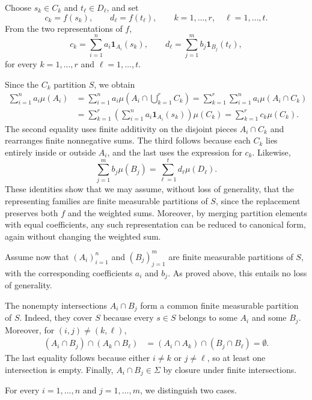 Choose $s_k\in C_k$ and $t_\ell\in D_\ell$, and set
\[
c_k=f(s_k),\qquad d_\ell=f(t_\ell),
\qquad k=1,\ldots,r,\quad \ell=1,\ldots,t.
\]
From the two representations of $f$,
\[
c_k=\sum_{i=1}^{n}a_i\mathbf1_{A_i}(s_k),\qquad
d_\ell=\sum_{j=1}^{m}b_j\mathbf1_{B_j}(t_\ell),
\]
for every $k=1,\ldots,r$ and $\ell=1,\ldots,t$.

Since the $C_k$ partition $S$, we obtain
\[
\begin{aligned}
\sum_{i=1}^{n}a_i\mu(A_i)&=\sum_{i=1}^{n}a_i\mu\left(A_i\cap\bigcup_{k=1}^{r}C_k\right) =\sum_{k=1}^{r}\sum_{i=1}^{n}a_i\mu(A_i\cap C_k)\\
&=\sum_{k=1}^{r}\left(\sum_{i=1}^{n}a_i\mathbf1_{A_i}(s_k)\right)\mu(C_k) =\sum_{k=1}^{r}c_k\mu(C_k).
\end{aligned}
\]
The second equality uses finite additivity on the disjoint pieces $A_i\cap C_k$ and rearranges finite nonnegative sums. The third follows because each $C_k$ lies entirely inside or outside $A_i$, and the last uses the expression for $c_k$. Likewise,
\[
\sum_{j=1}^{m}b_j\mu(B_j)=\sum_{\ell=1}^{t}d_\ell\mu(D_\ell).
\]
These identities show that we may assume, without loss of generality, that the representing families are finite measurable partitions of $S$, since the replacement preserves both $f$ and the weighted sums. Moreover, by merging partition elements with equal coefficients, any such representation can be reduced to canonical form, again without changing the weighted sum.

\par\noindent{}\par\nobreak

Assume now that $(A_i)_{i=1}^{n}$ and $(B_j)_{j=1}^{m}$ are finite measurable partitions of $S$, with the corresponding coefficients $a_i$ and $b_j$. As proved above, this entails no loss of generality.

The nonempty intersections $A_i\cap B_j$ form a common finite measurable partition of $S$. Indeed, they cover $S$ because every $s\in S$ belongs to some $A_i$ and some $B_j$. Moreover, for $(i,j)\neq(k,\ell)$,
\[
\begin{aligned}
(A_i\cap B_j)\cap(A_k\cap B_\ell)&=(A_i\cap A_k)\cap(B_j\cap B_\ell) =\emptyset.
\end{aligned}
\]
The last equality follows because either $i\neq k$ or $j\neq\ell$, so at least one intersection is empty. Finally, $A_i\cap B_j\in\Sigma$ by closure under finite intersections.

For every $i=1,\ldots,n$ and $j=1,\ldots,m$, we distinguish two cases.

